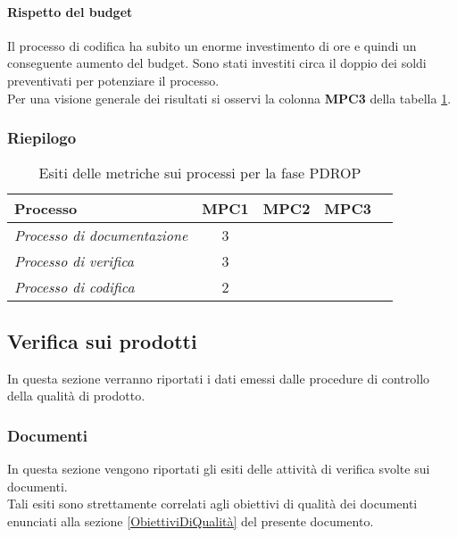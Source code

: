 \documentclass[../PianoDiQualifica.tex]{subfiles}
\begin{document}
\begin{appendices}
			\paragraph{Rispetto del budget}
			Il processo di codifica ha subito un enorme investimento di ore e quindi un conseguente aumento del budget. Sono stati investiti circa il doppio dei soldi preventivati per potenziare il processo. \\
			Per una visione generale dei risultati si osservi la colonna \textbf{MPC3}  della tabella \ref{tab:esiti_metriche_processi}.
			
			\subsubsection{Riepilogo}
			
			\begin{table}[H]
				\centering
				\begin{tabular}{l * {4}{c}}
					\toprule
					\textbf{Processo} & \textbf{MPC1} & \textbf{MPC2} & \textbf{MPC3} \\
					\midrule
					\textit{Processo di documentazione} & 3 & \color{dkgreen}{0\%} &  \color{dkgreen}{0\%} \\
					\textit{Processo di verifica} & 3 & \color{dkgreen}{0\%} &  \color{dkgreen}{0\%} \\
					\textit{Processo di codifica} & 2 & \color{dkgreen}{0\%} &  \color{red}{+187\%} \\
					\bottomrule
				\end{tabular}
				\caption{Esiti delle metriche sui processi per la fase PDROP}
				\label{tab:esiti_metriche_processi}
			\end{table}
			
			
	\subsection{Verifica sui prodotti}
	In questa sezione verranno riportati i dati emessi dalle procedure di controllo della qualità di prodotto\g.
	
		\subsubsection{Documenti}
		In questa sezione vengono riportati gli esiti delle attività di verifica svolte sui documenti.\\
		Tali esiti sono strettamente correlati agli obiettivi di qualità dei documenti enunciati alla sezione \ref{ObiettiviDiQualità} del presente documento.
			

\end{appendices}
\end{document}
